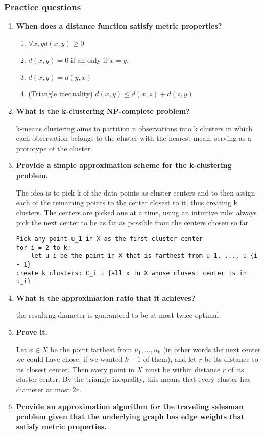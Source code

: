 \documentclass[a4paper,11pt]{article}
\begin{document}
\subsubsection{Practice questions}\label{practice-questions-23}

\begin{enumerate}
\def\labelenumi{\arabic{enumi}.}
\item
  \textbf{When does a distance function satisfy metric properties?}

  \begin{enumerate}
  \def\labelenumii{\arabic{enumii}.}
  \itemsep1pt\parskip0pt
  \item
    $\forall x, y d(x, y) \ge 0 $
  \item
    $d(x, y) = 0$ if an only if $x = y$.
  \item
    $d(x, y) = d(y, x)$
  \item
    (Triangle inequality) $d(x, y) \le d(x, z) + d(z, y)$
  \end{enumerate}
\item
  \textbf{What is the k-clustering NP-complete problem?}

  k-means clustering aims to partition n observations into k clusters in
  which each observation belongs to the cluster with the nearest mean,
  serving as a prototype of the cluster.
\item
  \textbf{Provide a simple approximation scheme for the k-clustering
  problem.}

  The idea is to pick k of the data points as cluster centers and to
  then assign each of the remaining points to the center closest to it,
  thus creating k clusters. The centers are picked one at a time, using
  an intuitive rule: always pick the next center to be as far as
  possible from the centers chosen so far

\begin{verbatim}
Pick any point u_1 in X as the first cluster center
for i = 2 to k:
    let u_i be the point in X that is farthest from u_1, ..., u_{i - 1}
create k clusters: C_i = {all x in X whose closest center is in u_i}
\end{verbatim}
\item
  \textbf{What is the approximation ratio that it achieves?}

  the resulting diameter is guaranteed to be at most twice optimal.
\item
  \textbf{Prove it.}

  Let $x \in X$ be the point farthest from $u_1, ..., u_k$ (in other
  words the next center we could have chose, if we wanted $k+1$ of
  them), and let $r$ be its distance to its closest center. Then every
  point in $X$ must be within distance $r$ of its cluster center. By the
  triangle inequality, this means that every cluster has diameter at
  most $2r$.
\item
  \textbf{Provide an approximation algorithm for the traveling salesman
  problem given that the underlying graph has edge weights that satisfy
  metric properties.}


\end{enumerate}
\end{document}
